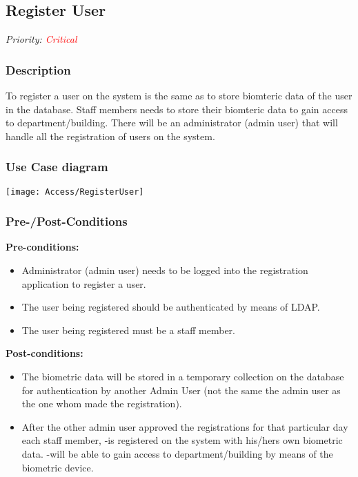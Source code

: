 \subsection{Register User}
\textit{Priority: \textcolor{red}{Critical}} 

\subsubsection{Description}
To register a user on the system is the same as to store biomteric data of the user in the database.
Staff members needs to store their biomteric data to gain access to department/building. There will be an administrator (admin user) that will handle all the registration of users on the system.

\subsubsection{Use Case diagram}
\texttt{[image: Access/RegisterUser]}

\subsubsection{Pre-/Post-Conditions}
\textbf{Pre-conditions:} 
	\begin{itemize}
		\item Administrator (admin user) needs to be logged into the registration application to register a user.
		\item The user being registered should be authenticated by means of LDAP. 
		\item The user being registered must be a staff member.
	\end{itemize}
\textbf{ Post-conditions:} 
	\begin{itemize}
		\item The biometric data will be stored in a temporary collection on the database for authentication by another Admin User (not the same the admin user as the one whom made the registration).
		\item After the other admin user approved the registrations for that particular day each staff member, 
			\subitem-is registered on the system with his/hers own biometric data.
			\subitem-will be able to gain access to department/building by means of the biometric device.
	\end{itemize}
